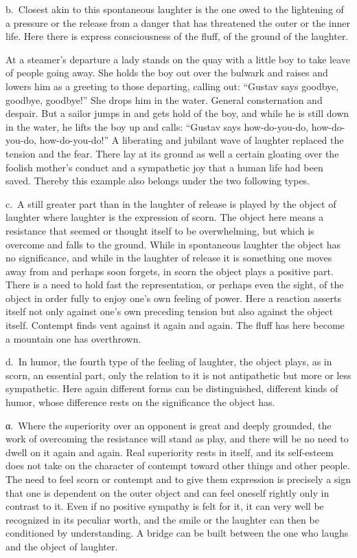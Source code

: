 \documentclass[12pt]{book}
\newcommand{\opage}[1]{\marginnote{\footnotesize\textit{[#1]}}}
\begin{document}
b.~Closest akin to this spontaneous laughter is the one owed to the lightening of
a pressure or the release from a danger that has \opage{52}threatened the outer or
the inner life. Here there is express consciousness of the fluff, of the ground of
the laughter.

At a steamer's departure a lady stands on the quay with a little boy to take leave
of people going away. She holds the boy out over the bulwark and raises and lowers
him as a greeting to those departing, calling out: ``Gustav says goodbye, goodbye,
goodbye!'' She drops him in the water. General consternation and despair. But a
sailor jumps in and gets hold of the boy, and while he is still down in the water,
he lifts the boy up and calls: ``Gustav says how-do-you-do, how-do-you-do,
how-do-you-do!'' A liberating and jubilant wave of laughter replaced the tension
and the fear. There lay at its ground as well a certain gloating over the foolish
mother's conduct and a sympathetic joy that a human life had been saved. Thereby
this example also belongs under the two following types.

c.~A still greater part than in the laughter of release is played by the object of
laughter where laughter is the expression of scorn. The object here means a
resistance that seemed or thought itself to be overwhelming, but which is overcome
and falls to the ground. While in spontaneous laughter the object has no
significance, and while in the laughter of release it is something one moves away
from and perhaps soon forgets, in scorn the object plays a positive part. There is
a need to hold fast the representation, or perhaps even the sight, of the object in
order fully to enjoy one's own feeling of power. Here a reaction asserts itself not
only against one's own preceding tension but also against the object itself.
Contempt finds vent against it again and again. The fluff has here become a
mountain one has overthrown.

d.~In humor, the fourth type of the feeling of laughter, the object plays, as in
scorn, an essential part, only the relation to it is not antipathetic but more or
less sympathetic. Here again different forms can be distinguished, different kinds
of humor, whose difference rests on the significance the object has.

α.~Where the superiority over an opponent is great and deeply grounded, the work of
overcoming the resistance will stand as play, and there will be no need to dwell
on it again and again. Real superiority rests in itself, and its
\opage{53}self-esteem does not take on the character of contempt toward other
things and other people. The need to feel scorn or contempt and to give them
expression is precisely a sign that one is dependent on the outer object and can
feel oneself rightly only in contrast to it. Even if no positive sympathy is felt
for it, it can very well be recognized in its peculiar worth, and the smile or the
laughter can then be conditioned by understanding. A bridge can be built between
the one who laughs and the object of laughter.
\end{document}
